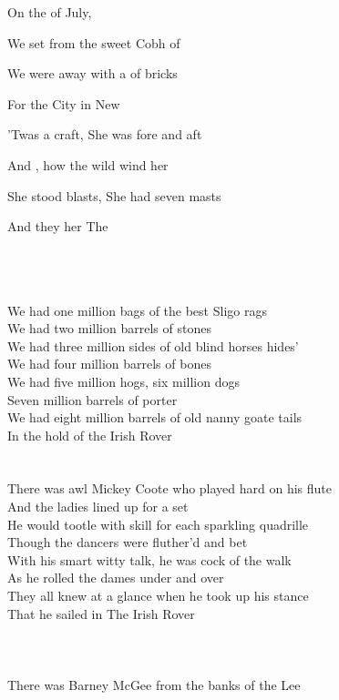 \begin{SBVerse*}
On the  of July, 

We set  from the sweet Cobh of 

We were  away with a  of bricks

For the  City  in New 

'Twas a  craft, She was  fore and aft

And , how the wild wind  her

She stood  blasts, She had  seven masts

And they  her The  
\end{SBVerse*}
~\\
~\\
~\\
We had one million bags of the best Sligo rags\\
We had two million barrels of stones\\
We had three million sides of old blind horses hides'\\
We had four million barrels of bones\\
We had five million hogs, six million dogs\\
Seven million barrels of porter\\
We had eight million barrels of old nanny goate tails\\
In the hold of the Irish Rover\\
~\\
~\\
There was awl Mickey Coote who played hard on his flute\\
And the ladies lined up for a set\\
He would tootle with skill for each sparkling quadrille\\
Though the dancers were fluther'd and bet\\
With his smart witty talk, he was cock of the walk\\
As he rolled the dames under and over\\
They all knew at a glance when he took up his stance\\
That he sailed in The Irish Rover\\
~\\
~\\
~\\
There was Barney McGee from the banks of the Lee\\
